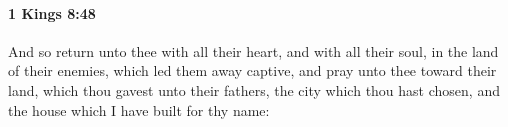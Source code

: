 
		\paragraph{1 Kings 8:48} %
			\label{1KINGS-8-48}

			And so return unto thee with all their heart, and with all their soul, in the land of their enemies, which led them away captive, and pray unto thee toward their land, which thou gavest unto their fathers, the city which thou hast chosen, and the house which I have built for thy name:


